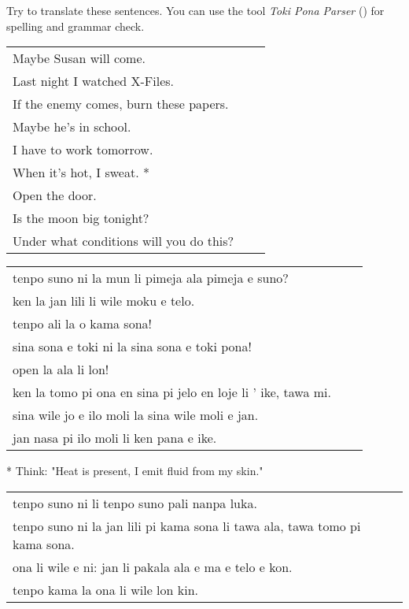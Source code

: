Try to translate these sentences. 
You can use the tool \textit{Toki Pona Parser} (\cite{www:rowa:02}) for spelling and grammar check. 

\begin{supertabular}{p{5,5cm}|ll}
Maybe Susan will come.  && \\ %
Last night I watched X-Files.  &&   \\ %
If the enemy comes, burn these papers.  &&   \\ %
Maybe he's in school.  &&   \\ %
I have to work tomorrow.  &&   \\ %
When it's hot, I sweat. *  &&  \\ %
Open the door.   &&  \\ %
Is the moon big tonight?  &&  \\ %
Under what conditions will you do this? &&  \\ %
\end{supertabular}

\begin{supertabular}{p{5,5cm}|ll}
tenpo suno ni la mun li pimeja ala pimeja e suno? &&  \\ %
ken la jan lili li wile moku e telo.  &&   \\ %
tenpo ali la o kama sona!   &&  \\ %
sina sona e toki ni la sina sona e toki pona!   &&  \\ %
open la ala li lon! &&  \\  %
ken la tomo pi ona en sina pi jelo en loje li ' ike, tawa mi. &&  \\  %
sina wile jo e ilo moli la sina wile moli e jan. &&  \\  %
jan nasa pi ilo moli li ken pana e ike. &&  \\ %
\end{supertabular}

* Think: "Heat is present, I emit fluid from my skin."

\begin{supertabular}{p{5,5cm}|ll}
tenpo suno ni li tenpo suno pali nanpa luka. && \\ %
tenpo suno ni la jan lili pi kama sona li tawa ala, tawa tomo pi kama sona. && \\ %
ona li wile e ni: jan li pakala ala e ma e telo e kon. && \\ %
tenpo kama la ona li wile lon kin. && \\ %
\end{supertabular}

